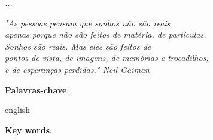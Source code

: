 \documentclass[
	12pt,				%
	openright,			%
	oneside,			%
	a4paper,			%
	chapter=TITLE,		%
	english,			%
	brazil,				%
	]{abntex2}
\begin{document}

\frenchspacing 


\imprimircapa

\imprimirfolhaderosto*


\begin{dedicatoria}
   \vspace*{\fill}
   \centering
   \noindent
   \textit{...} \vspace*{\fill}
\end{dedicatoria}


\begin{agradecimentos}
	\vspace{\fill}
	


\end{agradecimentos}

\begin{epigrafe}
    \vspace*{\fill}
	\begin{flushright}
		\textit{"As pessoas pensam que sonhos não são reais \\ apenas porque não são feitos de matéria, de partículas.\\ Sonhos são reais. Mas eles são feitos de \\ pontos de vista, de imagens, de memórias e trocadilhos, \\ e de esperanças perdidas."  Neil Gaiman}
	\end{flushright}
\end{epigrafe}

\setlength{\absparsep}{18pt} %
\begin{resumo}



\textbf{Palavras-chave}:
\end{resumo}

\begin{resumo}[Abstract]
 \begin{otherlanguage*}{english}
   
   
   \vspace{\onelineskip}
 
 
 
   \noindent 
   \textbf{Key words}:  
 \end{otherlanguage*}
\end{resumo}
\end{document}
